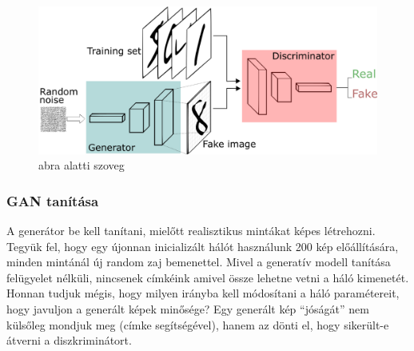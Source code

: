 

\begin{figure}[ht]
	\centering
	\includegraphics[width=0.9\columnwidth]{figures/gan_struct.png}
	\caption{abra alatti szoveg}
	\label{fig:gan_struct}
\end{figure}

\subsubsection{GAN tanítása}

A generátor be kell tanítani, mielőtt realisztikus mintákat képes létrehozni. Tegyük fel, hogy egy újonnan inicializált hálót használunk 200 kép előállítására, minden mintánál új random zaj bemenettel. Mivel a generatív modell tanítása felügyelet nélküli, nincsenek címkéink amivel össze lehetne vetni a háló kimenetét. Honnan tudjuk mégis, hogy milyen irányba kell módosítani a háló paramétereit, hogy javuljon a generált képek minősége? Egy generált kép ``jóságát'' nem külsőleg mondjuk meg (címke segítségével), hanem az dönti el, hogy sikerült-e átverni a diszkriminátort.

